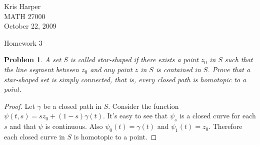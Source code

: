 \documentclass{article}
\newtheorem{problem}{Problem}
\begin{document}
\begin{flushright}
Kris Harper\\

MATH 27000\\

October 22, 2009
\end{flushright}

\begin{center}
Homework 3
\end{center}

\begin{problem}
\label{star}
A set $S$ is called star-shaped if there exists a point $z_0$ in $S$ such that the line segment between $z_0$ and any point $z$ in $S$ is contained in $S$. Prove that a star-shaped set is simply connected, that is, every closed path is homotopic to a point.
\end{problem}
\begin{proof}
Let $\gamma$ be a closed path in $S$. Consider the function $\psi(t,s) = sz_0 + (1-s)\gamma(t)$. It's easy to see that $\psi_s$ is a closed curve for each $s$ and that $\psi$ is continuous. Also $\psi_0(t) = \gamma(t)$ and $\psi_1(t) = z_0$. Therefore each closed curve in $S$ is homotopic to a point.
\end{proof}
\end{document}
